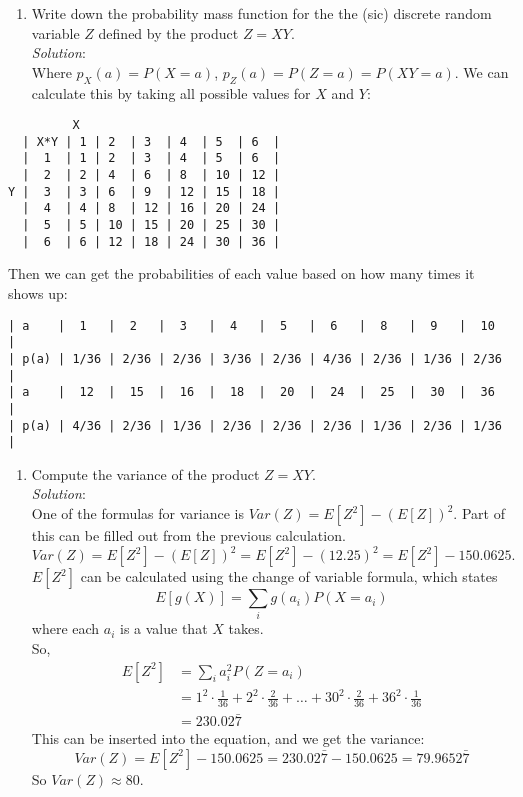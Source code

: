 \documentclass[
]{article}
\providecommand{\tightlist}{%
  \setlength{\itemsep}{0pt}\setlength{\parskip}{0pt}}
\begin{document}
\begin{enumerate}
\def\labelenumi{(\alph{enumi})}
\setcounter{enumi}{1}
\tightlist
\item
  Write down the probability mass function for the the (sic) discrete
  random variable \(Z\) defined by the product \(Z=XY\).\\
  \emph{Solution}:\\
  Where \(p_X(a)=P(X=a)\), \(p_Z(a)=P(Z=a)=P(XY=a)\). We can calculate
  this by taking all possible values for \(X\) and \(Y\):\\
\end{enumerate}

\begin{verbatim}
         X
  | X*Y | 1 | 2  | 3  | 4  | 5  | 6  |
  |  1  | 1 | 2  | 3  | 4  | 5  | 6  |
  |  2  | 2 | 4  | 6  | 8  | 10 | 12 |
Y |  3  | 3 | 6  | 9  | 12 | 15 | 18 |
  |  4  | 4 | 8  | 12 | 16 | 20 | 24 |
  |  5  | 5 | 10 | 15 | 20 | 25 | 30 |
  |  6  | 6 | 12 | 18 | 24 | 30 | 36 |
\end{verbatim}

Then we can get the probabilities of each value based on how many times
it shows up:

\begin{verbatim}
| a    |  1   |  2   |  3   |  4   |  5   |  6   |  8   |  9   |  10  |
| p(a) | 1/36 | 2/36 | 2/36 | 3/36 | 2/36 | 4/36 | 2/36 | 1/36 | 2/36 |
| a    |  12  |  15  |  16  |  18  |  20  |  24  |  25  |  30  |  36  |
| p(a) | 4/36 | 2/36 | 1/36 | 2/36 | 2/36 | 2/36 | 1/36 | 2/36 | 1/36 |
\end{verbatim}

\begin{enumerate}
\def\labelenumi{(\alph{enumi})}
\setcounter{enumi}{2}
\tightlist
\item
  Compute the variance of the product \(Z=XY\).\\
  \emph{Solution}:\\
  One of the formulas for variance is \(Var(Z)=E[Z^2]-(E[Z])^2\). Part
  of this can be filled out from the previous calculation.\\
  \[
  Var(Z)=E[Z^2]-(E[Z])^2=E[Z^2]-(12.25)^2=E[Z^2]-150.0625.
  \] \(E[Z^2]\) can be calculated using the change of variable formula,
  which states \[
  E[g(X)]=\sum_i g(a_i)P(X=a_i)
  \] where each \(a_i\) is a value that \(X\) takes.\\
  So, \[
  \begin{aligned}
  E[Z^2]&=\sum_i a_i^2P(Z=a_i) \\
  &=1^2\cdot\frac{1}{36}+2^2\cdot\frac{2}{36}+\dots+30^2\cdot\frac{2}{36}+36^2\cdot\frac{1}{36} \\
  &=230.02\bar{7}
  \end{aligned}
  \] This can be inserted into the equation, and we get the variance: \[
  Var(Z)=E[Z^2]-150.0625=230.02\bar{7}-150.0625=79.9652\bar{7}
  \] So \(Var(Z)\approx80\).
\end{enumerate}
\end{document}
